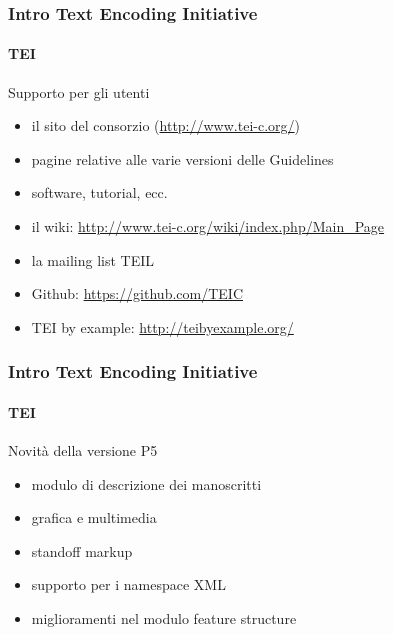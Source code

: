 \begin{frame}
	\frametitle{Intro Text Encoding Initiative}
	\framesubtitle{TEI}
	\addtocounter{nframe}{1}

	\begin{block}{Supporto per gli utenti}
		\begin{itemize}
			\item il sito del consorzio (\url{http://www.tei-c.org/})
			\item pagine relative alle varie versioni delle Guidelines
			\item software, tutorial, ecc.
			\item il wiki: \url{http://www.tei-c.org/wiki/index.php/Main_Page}
			\item la mailing list TEI\-L
			\item Github: \url{https://github.com/TEIC}
			\item TEI by example: \url{http://teibyexample.org/}
		\end{itemize}
	\end{block}
\end{frame}


\begin{frame}
	\frametitle{Intro Text Encoding Initiative}
	\framesubtitle{TEI}
	\addtocounter{nframe}{1}

	\begin{block}{Novità della versione P5}
		\begin{itemize}
			\item modulo di descrizione dei manoscritti
			\item grafica e multimedia
			\item standoff markup
			\item supporto per i namespace XML
			\item miglioramenti nel modulo feature structure
		\end{itemize}

	\end{block}

\end{frame}



